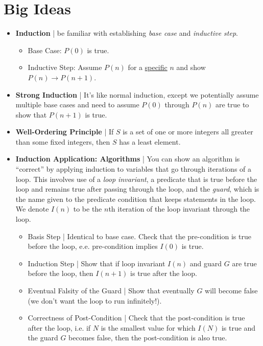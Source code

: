 \documentclass[11pt]{article}
\begin{document}
{\raggedright}
\newcommand\NAME{Ojas Chaturvedi}  %
\newcommand\EMAILID{oj.chaturvedi.2024@gmail.com}
\newcommand\TESTNUM{3}

\section*{Big Ideas}
\begin{itemize}
    \item \textbf{Induction} | be familiar with establishing \textit{base case} and \textit{inductive step}.
    \begin{itemize}
        \item Base Case: $P(0)$ is true.
        \item Inductive Step: Assume $P(n)$ for a \underline{specific} $n$ and show $P(n) \rightarrow P(n+1)$.
    \end{itemize}
    \item \textbf{Strong Induction} | It's like normal induction, except we potentially assume multiple base cases and need to assume $P(0)$ through $P(n)$ are true to show that $P(n+1)$ is true.
    \item \textbf{Well-Ordering Principle} | If $S$ is a set of one or more integers all greater than some fixed integers, then $S$ has a least element.
    \item \textbf{Induction Application: Algorithms} | You can show an algorithm is ``correct'' by applying induction to variables that go through iterations of a loop. This involves use of a \textit{loop invariant}, a predicate that is true before the loop and remains true after passing through the loop, and the \textit{guard}, which is the name given to the predicate condition that keeps statements in the loop. We denote $I(n)$ to be the $n$th iteration of the loop invariant through the loop.
    \begin{itemize}
        \item Basis Step | Identical to base case. Check that the pre-condition is true before the loop, e.e. pre-condition implies $I(0)$ is true.
        \item Induction Step | Show that if loop invariant $I(n)$ and guard $G$ are true before the loop, then $I(n+1)$ is true after the loop.
        \item Eventual Falsity of the Guard | Show that eventually $G$ will become false (we don't want the loop to run infinitely!).
        \item Correctness of Post-Condition | Check that the post-condition is true after the loop, i.e. if $N$ is the smallest value for which $I(N)$ is true and the guard $G$ becomes false, then the post-condition is also true.

\end{itemize}
\end{itemize}
\end{document}
